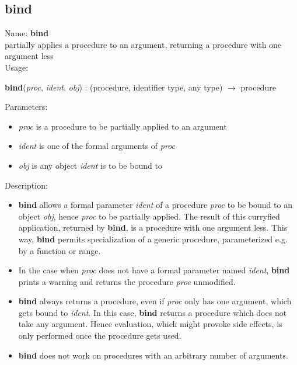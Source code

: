 \subsection{bind}
\label{labbind}
\noindent Name: \textbf{bind}\\
partially applies a procedure to an argument, returning a procedure with one argument less\\
\noindent Usage: 
\begin{center}
\textbf{bind}(\emph{proc}, \emph{ident}, \emph{obj}) : (\textsf{procedure}, \textsf{identifier type}, \textsf{any type}) $\rightarrow$ \textsf{procedure}\\
\end{center}
Parameters: 
\begin{itemize}
\item \emph{proc} is a procedure to be partially applied to an argument
\item \emph{ident} is one of the formal arguments of \emph{proc}
\item \emph{obj} is any \sollya object \emph{ident} is to be bound to
\end{itemize}
\noindent Description: \begin{itemize}

\item \textbf{bind} allows a formal parameter \emph{ident} of a procedure \emph{proc} to 
   be bound to an object \emph{obj}, hence \emph{proc} to be partially applied.
   The result of this curryfied application, returned by \textbf{bind}, is 
   a procedure with one argument less. This way, \textbf{bind} permits 
   specialization of a generic procedure, parameterized e.g. by a function
   or range.

\item In the case when \emph{proc} does not have a formal parameter named 
   \emph{ident}, \textbf{bind} prints a warning and returns the procedure 
   \emph{proc} unmodified. 

\item \textbf{bind} always returns a procedure, even if \emph{proc} only has one 
   argument, which gets bound to \emph{ident}. In this case, \textbf{bind}
   returns a procedure which does not take any argument. Hence 
   evaluation, which might provoke side effects, is only performed
   once the procedure gets used.

\item \textbf{bind} does not work on procedures with an arbitrary number
   of arguments.
\end{itemize}
